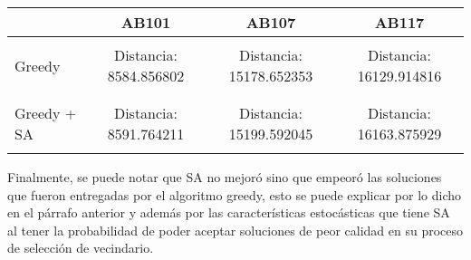 \documentclass[letter, 10pt]{article}
\begin{document}
\begin{center}
\begin{tabular}{ |l|c|c|c| }
\hline
 & AB101 & AB107 & AB117 \\ \hline
\multirow{3}{*}{Greedy}
 & & & \\
 & Distancia: 8584.856802 & Distancia: 15178.652353 & Distancia: 16129.914816 \\
 & & & \\

 \hline
\multirow{3}{*}{Greedy + SA}
 & & & \\
 & Distancia: 8591.764211 & Distancia: 15199.592045 & Distancia: 16163.875929 \\
 & & & \\
 \hline
\end{tabular}
\end{center}

Finalmente, se puede notar que SA no mejoró sino que empeoró las soluciones que fueron entregadas por el algoritmo greedy, esto se puede explicar por lo dicho en el párrafo anterior y además por las características estocásticas que tiene SA al tener la probabilidad de poder aceptar soluciones de peor calidad en su proceso de selección de vecindario.
\end{document}
